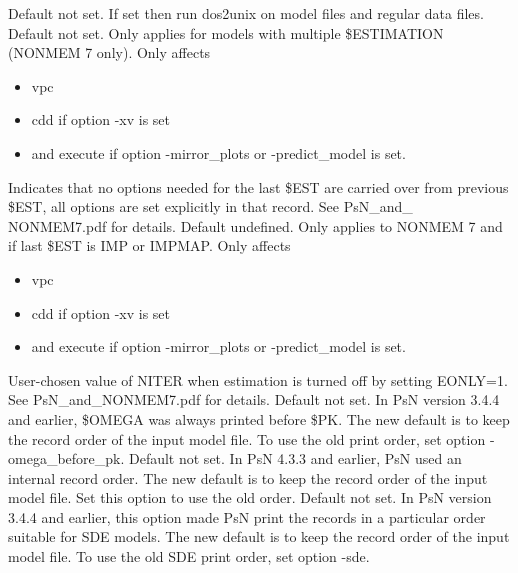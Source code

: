 \begin{optionlist}
Default not set. If set then run dos2unix on model files and regular data files.
\nextopt
{}
Default not set. Only applies for models with multiple \$ESTIMATION (NONMEM 7 only). Only affects 
\begin{itemize}
\item vpc
\item cdd if option -xv is set
\item and execute if option -mirror\_plots or -predict\_model is set.
\end{itemize} 
Indicates that no options needed for the last \$EST are carried over from previous \$EST, all options are set explicitly in that record. See PsN\_and\_ NONMEM7.pdf for details. 
\nextopt
{}
Default undefined. Only applies to NONMEM 7 and if last \$EST is IMP or IMPMAP.  Only affects
\begin{itemize}
	\item vpc
	\item cdd if option -xv is set
	\item and execute if option -mirror\_plots or -predict\_model is set.
\end{itemize}
User-chosen value of NITER when estimation is turned off by setting EONLY=1. See PsN\_and\_NONMEM7.pdf for details. 
\nextopt
{}
Default not set. In PsN version 3.4.4 and earlier, \$OMEGA was always printed before \$PK. The new default is to keep the record order of the input model file. To use the old print order, set option -omega\_before\_pk.
\nextopt
{}
Default not set. In PsN 4.3.3 and earlier, PsN used an internal record order. The new default is to keep the record order of the input model file. Set this option to use the old order.
\nextopt
{}
Default not set. In PsN version 3.4.4 and earlier, this option made PsN print the records in a particular order suitable for SDE models. The new default is to keep the record order of the input model file. To use the old SDE print order, set option -sde.
\nextopt
\end{optionlist}
